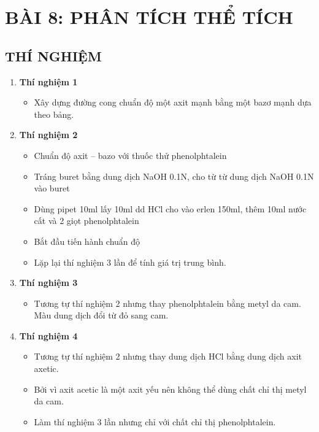 \clearpage
\setcounter{section}{8}
\setcounter{subsection}{0}
\section*{\centering BÀI 8: PHÂN TÍCH THỂ TÍCH}
\subsection{THÍ NGHIỆM}
\begin{enumerate}
    \item \textbf{Thí nghiệm 1}
    \begin{itemize}
        \item Xây dựng đường cong chuẩn độ một axit mạnh bằng một bazơ mạnh dựa theo bảng.
    \end{itemize}
    \item \textbf{Thí nghiệm 2}
    \begin{itemize}
        \item Chuẩn độ axit – bazo với thuốc thử phenolphtalein
        \item Tráng buret bằng dung dịch NaOH 0.1N, cho từ từ dung dịch NaOH 0.1N vào buret
        \item Dùng pipet 10ml lấy 10ml dd HCl cho vào erlen 150ml, thêm 10ml nước cất và 2 giọt phenolphtalein
        \item Bắt đầu tiến hành chuẩn độ
        \item Lặp lại thí nghiệm 3 lần để tính giá trị trung bình.
    \end{itemize}
    \item \textbf{Thí nghiệm 3}
    \begin{itemize}
        \item Tương tự thí nghiệm 2 nhưng thay phenolphtalein bằng metyl da cam. Màu dung dịch đổi từ đỏ sang cam.
    \end{itemize}
    \item \textbf{Thí nghiệm 4}
    \begin{itemize}
        \item Tương tự thí nghiệm 2 nhưng thay dung dịch HCl bằng dung dịch axit axetic.
        \item Bởi vì axit acetic là một axit yếu nên không thể dùng chất chỉ thị metyl da cam.
        \item Làm thí nghiệm 3 lần nhưng chỉ với chất chỉ thị phenolphtalein.
    \end{itemize}
\end{enumerate}

